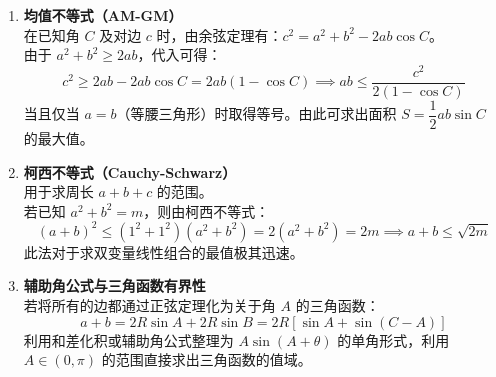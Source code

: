 \documentclass[11pt,a4paper]{ctexart}
\begin{document}
\begin{enumerate}
  \item \textbf{均值不等式（AM-GM）} \\
    在已知角 $C$ 及对边 $c$ 时，由余弦定理有：$c^2 = a^2 + b^2 - 2ab \cos C$。\\
    由于 $a^2 + b^2 \ge 2ab$，代入可得：
    \[ c^2 \ge 2ab - 2ab \cos C = 2ab(1 - \cos C) \implies ab \le \frac{c^2}{2(1 - \cos C)} \]
    当且仅当 $a = b$（等腰三角形）时取得等号。由此可求出面积 $S = \dfrac{1}{2} ab \sin C$ 的最大值。
    
  \item \textbf{柯西不等式（Cauchy-Schwarz）} \\
    用于求周长 $a+b+c$ 的范围。\\
    若已知 $a^2 + b^2 = m$，则由柯西不等式：
    \[ (a + b)^2 \le (1^2 + 1^2)(a^2 + b^2) = 2(a^2 + b^2) = 2m \implies a+b \le \sqrt{2m} \]
    此法对于求双变量线性组合的最值极其迅速。
    
  \item \textbf{辅助角公式与三角函数有界性} \\
    若将所有的边都通过正弦定理化为关于角 $A$ 的三角函数：
    \[ a+b = 2R\sin A + 2R\sin B = 2R\left[\sin A + \sin(C-A)\right] \]
    利用和差化积或辅助角公式整理为 $A \sin(A + \theta)$ 的单角形式，利用 $A \in (0, \pi)$ 的范围直接求出三角函数的值域。
\end{enumerate}

\newpage
\label{LastPage}
\end{document}
